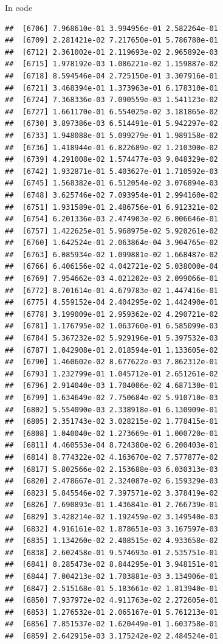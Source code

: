 \documentclass[ignorenonframetext,]{beamer}
\begin{document}
\begin{frame}[fragile]{In code}
\begin{verbatim}
##  [6706] 7.968610e-01 3.994956e-01 2.582264e-01
##  [6709] 2.281421e-02 7.217650e-01 5.786780e-01
##  [6712] 2.361002e-01 2.119693e-02 2.965892e-03
##  [6715] 1.978192e-03 1.086221e-02 1.159887e-02
##  [6718] 8.594546e-04 2.725150e-01 3.307916e-01
##  [6721] 3.468394e-01 1.373963e-01 6.178310e-01
##  [6724] 7.368336e-03 7.090559e-03 1.541123e-02
##  [6727] 1.661170e-01 6.554025e-02 3.181865e-02
##  [6730] 3.897386e-03 6.514491e-01 5.942297e-02
##  [6733] 1.948088e-01 5.099279e-01 1.989158e-02
##  [6736] 1.418944e-01 6.822689e-02 1.210300e-02
##  [6739] 4.291008e-02 1.574477e-03 9.048329e-02
##  [6742] 1.932871e-01 5.403627e-01 1.710592e-03
##  [6745] 1.568382e-01 6.512054e-02 3.076894e-03
##  [6748] 3.625746e-02 7.093954e-01 2.994160e-02
##  [6751] 1.931589e-01 2.486756e-01 6.912321e-02
##  [6754] 6.201336e-03 2.474903e-02 6.006646e-01
##  [6757] 1.422625e-01 5.968975e-02 5.920261e-02
##  [6760] 1.642524e-01 2.063864e-04 3.904765e-02
##  [6763] 6.085934e-02 1.099881e-02 1.668487e-02
##  [6766] 6.406156e-02 4.042721e-02 5.038000e-04
##  [6769] 7.954662e-03 4.021202e-03 2.099066e-01
##  [6772] 8.701614e-01 4.679783e-02 1.447416e-01
##  [6775] 4.559152e-04 2.404295e-02 1.442490e-01
##  [6778] 3.199009e-01 2.959362e-02 4.290721e-02
##  [6781] 1.176795e-02 1.063760e-01 6.585099e-03
##  [6784] 5.367232e-02 5.929196e-01 5.397532e-03
##  [6787] 1.042908e-01 2.018594e-01 1.133605e-02
##  [6790] 1.460602e-02 8.677622e-03 7.862312e-01
##  [6793] 1.232799e-01 1.045712e-01 2.651261e-02
##  [6796] 2.914040e-03 1.704006e-02 4.687130e-01
##  [6799] 1.634649e-02 7.750684e-02 5.910710e-03
##  [6802] 5.554090e-03 2.338918e-01 6.130909e-01
##  [6805] 2.351743e-02 3.028215e-02 1.778415e-01
##  [6808] 1.040040e-02 1.273669e-01 1.000720e-01
##  [6811] 4.460553e-04 8.724380e-02 6.200403e-01
##  [6814] 8.774322e-02 4.163670e-02 7.577877e-02
##  [6817] 5.802566e-02 2.153688e-03 6.030313e-03
##  [6820] 2.478667e-01 2.324087e-02 6.159329e-03
##  [6823] 5.845546e-02 7.397571e-02 3.378419e-02
##  [6826] 7.690893e-01 1.436841e-01 2.766739e-01
##  [6829] 3.428214e-02 1.192459e-02 3.149540e-03
##  [6832] 4.916161e-02 1.878651e-03 3.167597e-03
##  [6835] 1.134260e-02 2.408515e-02 4.933658e-02
##  [6838] 2.602458e-01 9.574693e-01 2.535751e-01
##  [6841] 8.285473e-02 8.844295e-01 3.948151e-01
##  [6844] 7.004213e-02 1.703881e-03 3.134906e-01
##  [6847] 2.515168e-01 5.183661e-02 1.813940e-01
##  [6850] 7.937972e-02 4.911763e-02 2.272605e-01
##  [6853] 1.276532e-01 2.065167e-01 5.761213e-01
##  [6856] 7.851537e-02 1.620449e-01 1.603758e-01
##  [6859] 2.642915e-03 3.175242e-02 2.484524e-01

\end{verbatim}
\end{frame}
\end{document}
